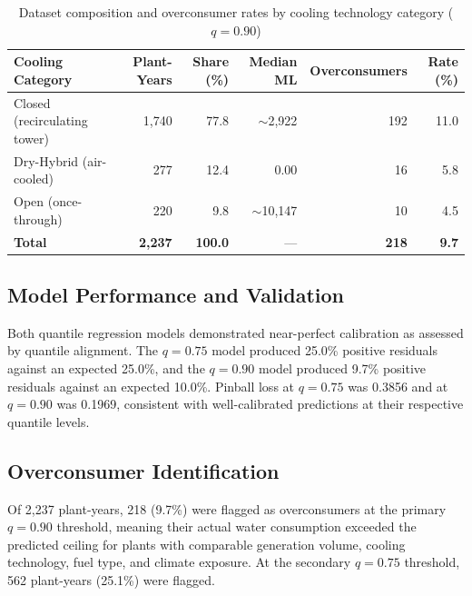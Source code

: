\documentclass[11pt, letterpaper]{article}
\begin{document}
\begin{table}[ht]
  \centering
  \caption{Dataset composition and overconsumer rates by cooling technology category ($q = 0.90$)}
  \label{tab:baseline}
  \small
  \begin{tabularx}{\linewidth}{Xrrrr r}
    \toprule
    \rowcolor{headerbg}
    \color{white}\textbf{Cooling Category} &
    \color{white}\textbf{Plant-Years} &
    \color{white}\textbf{Share (\%)} &
    \color{white}\textbf{Median ML} &
    \color{white}\textbf{Overconsumers} &
    \color{white}\textbf{Rate (\%)} \\
    \midrule
    Closed (recirculating tower) & 1{,}740 & 77.8 & $\sim$2{,}922  & 192 & 11.0 \\
    Dry-Hybrid (air-cooled)       &   277   & 12.4 & 0.00           &  16 &  5.8 \\
    Open (once-through)           &   220   &  9.8 & $\sim$10{,}147 &  10 &  4.5 \\
    \midrule
    \textbf{Total}                & \textbf{2{,}237} & \textbf{100.0} & --- & \textbf{218} & \textbf{9.7} \\
    \bottomrule
  \end{tabularx}
\end{table}

\subsection{Model Performance and Validation}

Both quantile regression models demonstrated near-perfect calibration as assessed by quantile alignment. The $q = 0.75$ model produced 25.0\% positive residuals against an expected 25.0\%, and the $q = 0.90$ model produced 9.7\% positive residuals against an expected 10.0\%. Pinball loss at $q = 0.75$ was 0.3856 and at $q = 0.90$ was 0.1969, consistent with well-calibrated predictions at their respective quantile levels.

\subsection{Overconsumer Identification}

Of 2{,}237 plant-years, 218 (9.7\%) were flagged as overconsumers at the primary $q = 0.90$ threshold, meaning their actual water consumption exceeded the predicted ceiling for plants with comparable generation volume, cooling technology, fuel type, and climate exposure. At the secondary $q = 0.75$ threshold, 562 plant-years (25.1\%) were flagged.
\end{document}
